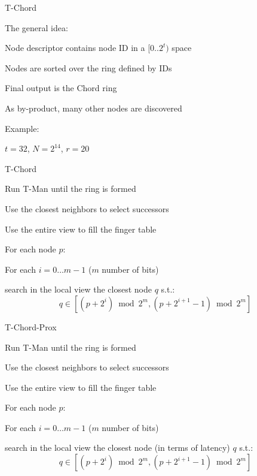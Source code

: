 \begin{frame}{T-Chord}
	
\BIL	
\item The general idea:
	\BI
	\item Node descriptor contains node ID in a $[0..2^t)$ space
	\item Nodes are sorted over the ring defined by IDs
	\item Final output is the Chord ring
	\item As by-product, many other nodes are discovered
	\EI
\item Example:
	\BI
	\item $t=32$, $N=2^{14}$, $r=20$
	\EI
\EIL

\begin{figure}	
\end{figure}
	
\end{frame}

\begin{frame}{T-Chord}

\BIL
\item Run T-Man until the ring is formed
\item Use the closest neighbors to select successors
\item Use the entire view to fill the finger table
	\BI
	\item For each node $p$:
	\item For each $i=0 \ldots m-1$ ($m$ number of bits)
	\item search in the local view \alert{the closest node} $q$ s.t.:
	\[
	q \in [(p + 2^i) \bmod 2^m, (p + 2^{i+1}-1) \bmod 2^m]
	\]
	\EI
\EIL

\end{frame}


\begin{frame}{T-Chord-Prox}

\BIL
\item Run T-Man until the ring is formed
\item Use the closest neighbors to select successors
\item Use the entire view to fill the finger table
	\BI
	\item For each node $p$:
	\item For each $i=0 \ldots m-1$ ($m$ number of bits)
	\item search in the local view \alert{the closest node (in terms of latency)} $q$ s.t.:
	\[
	q \in [(p + 2^i) \bmod 2^m, (p + 2^{i+1}-1) \bmod 2^m]
	\]
	\EI
\EIL

\end{frame}

